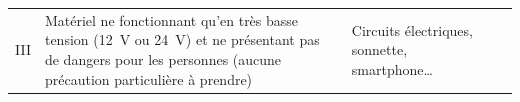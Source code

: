 \begin{xltabular}{\textwidth}{c X p{3cm} p{2cm} c}
\addlinespace
III		& Matériel ne fonctionnant qu'en très basse tension (\SI{12}{\volt}	ou \SI{24}{\volt}) et ne présentant pas de dangers pour les personnes (aucune précaution particulière à prendre)			& Circuits électriques, sonnette, smartphone\ldots		& 		& 
\end{xltabular}

